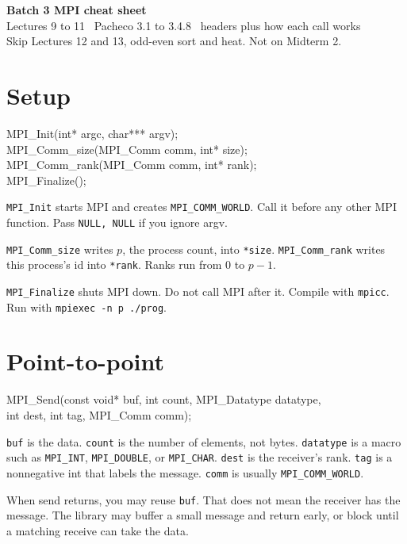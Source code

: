 \documentclass[9pt,letterpaper]{extarticle}
\newcommand{\sig}[1]{%
  \par\vspace{1pt}%
  \noindent\colorbox{codebg}{\parbox{\dimexpr\linewidth-2\fboxsep\relax}{%
    \raggedright\ttfamily\footnotesize #1}}%
  \par\vspace{1pt}%
}
\begin{document}
\thispagestyle{fancy}

\begin{center}
{\Large\bfseries\color{hdr} Batch 3 MPI cheat sheet}\\[1pt]
{\footnotesize\color{muted} Lectures 9 to 11 \textbullet\ Pacheco 3.1 to 3.4.8 \textbullet\ headers plus how each call works}\\[0.5pt]
{\scriptsize\color{muted} Skip Lectures 12 and 13, odd-even sort and heat. Not on Midterm 2.}
\end{center}

\section{Setup}
\sig{MPI\_Init(int* argc, char*** argv);\\
MPI\_Comm\_size(MPI\_Comm comm, int* size);\\
MPI\_Comm\_rank(MPI\_Comm comm, int* rank);\\
MPI\_Finalize();}

\texttt{MPI\_Init} starts MPI and creates \texttt{MPI\_COMM\_WORLD}. Call it before any other MPI function. Pass \texttt{NULL, NULL} if you ignore argv.

\texttt{MPI\_Comm\_size} writes $p$, the process count, into \texttt{*size}. \texttt{MPI\_Comm\_rank} writes this process's id into \texttt{*rank}. Ranks run from $0$ to $p-1$.

\texttt{MPI\_Finalize} shuts MPI down. Do not call MPI after it. Compile with \texttt{mpicc}. Run with \texttt{mpiexec -n p ./prog}.

\section{Point-to-point}
\sig{MPI\_Send(const void* buf, int count, MPI\_Datatype datatype,\\
\hspace*{1em}int dest, int tag, MPI\_Comm comm);}

\texttt{buf} is the data. \texttt{count} is the number of elements, not bytes. \texttt{datatype} is a macro such as \texttt{MPI\_INT}, \texttt{MPI\_DOUBLE}, or \texttt{MPI\_CHAR}. \texttt{dest} is the receiver's rank. \texttt{tag} is a nonnegative int that labels the message. \texttt{comm} is usually \texttt{MPI\_COMM\_WORLD}.

When send returns, you may reuse \texttt{buf}. That does not mean the receiver has the message. The library may buffer a small message and return early, or block until a matching receive can take the data.
\end{document}
